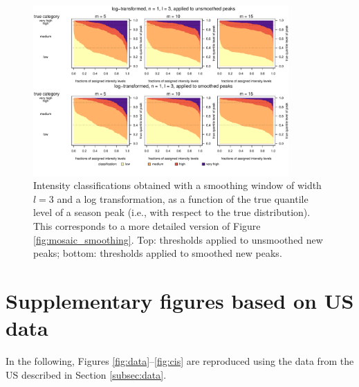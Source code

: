 \documentclass{article}
\begin{document}
\begin{figure}[h!]
\begin{center}
\includegraphics[width=0.87\textwidth]{figure/mosaic_log_smoothed_fr_fancy.pdf}
\caption{Intensity classifications obtained with a smoothing window of width $l = 3$ and a log transformation, as a function of the true quantile level of a season peak (i.e., with respect to the true distribution). This corresponds to a more detailed version of Figure \ref{fig:mosaic_smoothing}. Top: thresholds applied to unsmoothed new peaks; bottom: thresholds applied to smoothed new peaks.}
\label{fig:mosaic_smoothing_fancy}
\end{center}
\end{figure}

\newpage

\section{Supplementary figures based on US data}
\label{suppl:us}

In the following, Figures \ref{fig:data}--\ref{fig:cis} are reproduced using the data from the US described in Section \ref{subsec:data}.
\end{document}
